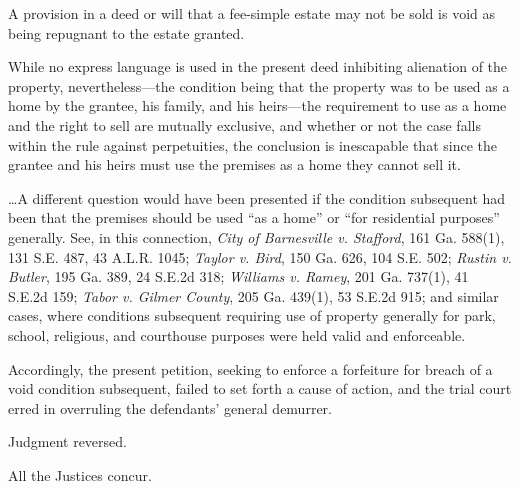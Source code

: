 A provision in a deed or will that a fee-simple estate may not be sold is void
as being repugnant to the estate granted.

While no express language is used in the present deed inhibiting alienation of
the property, nevertheless---the condition being that the property was to be
used as a home by the grantee, his family, and his heirs---the requirement to
use as a home and the right to sell are mutually exclusive, and whether or not
the case falls within the rule against perpetuities, the conclusion is
inescapable that since the grantee and his heirs must use the premises as a
home they cannot sell it.

\dots A different question would have been presented if the condition subsequent
had been that the premises should be used ``as a home'' or ``for residential
purposes'' generally. See, in this connection, \emph{City of Barnesville v.
Stafford}, 161 Ga. 588(1), 131 S.E. 487, 43 A.L.R. 1045; \emph{Taylor v. Bird},
150 Ga. 626, 104 S.E. 502; \emph{Rustin v. Butler}, 195 Ga. 389, 24 S.E.2d 318;
\emph{Williams v. Ramey}, 201 Ga. 737(1), 41 S.E.2d 159; \emph{Tabor v. Gilmer
County}, 205 Ga. 439(1), 53 S.E.2d 915; and similar cases, where conditions
subsequent requiring use of property generally for park, school, religious, and
courthouse purposes were held valid and enforceable.

Accordingly, the present petition, seeking to enforce a forfeiture for breach of
a void condition subsequent, failed to set forth a cause of action, and the
trial court erred in overruling the defendants' general demurrer.

Judgment reversed.

All the Justices concur.

